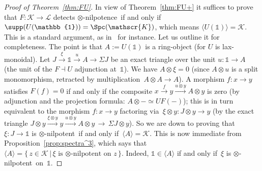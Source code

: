 \documentclass{amsart}
\numberwithin{equation}{section}
\theoremstyle{remark}
\begin{document}
\begin{proof}[Proof of Theorem~\ref{thm:FU}]
In view of Theorem~\ref{thm:FU+} it suffices to prove that $F\colon{\mathscr{{K}}}\to {\mathscr{{L}}}$ detects {$\otimes$-nilpotence}\ if and only if $\supp(U({\mathbb{1}}))={\Spc({\mathscr{K}})}$, which means ${\langle {U({\mathbb{1}})}\rangle}={\mathscr{{K}}}$. This is a standard argument, as in~\cite[Prop.\,3.15]{Balmer16a} for instance. Let us outline it for completeness. The point is that $A:=U({\mathbb{1}})$ is a ring-object (for $U$ is lax-monoidal). Let $J {\overset{{\xi}}\to} {\mathbb{1}} {\overset{{u}}\to} A \to \Sigma J$ be an exact triangle over the unit $u\colon{\mathbb{1}} \to A$ (the unit of the $F{\dashv} U$ adjunction at~${\mathbb{1}}$). We have $A\otimes \xi=0$ (since $A\otimes u$ is a split monomorphism, retracted by multiplication~$A\otimes A\to A$). A morphism $f\colon x\to y$ satisfies $F(f)=0$ if and only if the composite $x{\overset{{f}}\to}y{\overset{{u\otimes y}}\to}A\otimes y$ is zero (by adjunction and the projection formula: $A\otimes-\simeq UF(-)$); this is in turn equivalent to the morphism $f\colon x\to y$ factoring via~$\xi\otimes y\colon J\otimes y\to y$ (by the exact triangle $J\otimes y{\overset{{\xi\otimes y}}{\,{\mathop{\longrightarrow}\limits}\,}}y{\overset{{u\otimes y}}{\,{\mathop{\longrightarrow}\limits}\,}}A\otimes y{\overset{{}}{\,{\mathop{\longrightarrow}\limits}\,}}\Sigma J\otimes y$). So we are down to proving that $\xi\colon J\to {\mathbb{1}}$ is {$\otimes$-nilpotent}\ if and only if~${\langle {A}\rangle}={\mathscr{{K}}}$. This is now immediate from Proposition~\ref{prop:spectra^3}, which says that ${\langle {A}\rangle}={\big\{\,{z\in{\mathscr{{K}}}}\,\big|\,{\xi\textrm{ is {$\otimes$-nilpotent}\ on }z}\,\big\}}$. Indeed, ${\mathbb{1}}\in{\langle {A}\rangle}$ if and only if~$\xi$ is {$\otimes$-nilpotent}\ on~${\mathbb{1}}$.
\end{proof}
\end{document}
